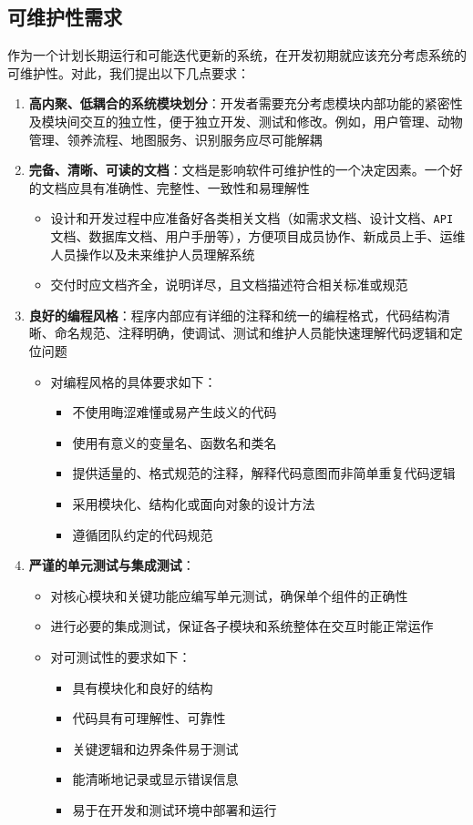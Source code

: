 \documentclass[12pt,a4paper,UTF8]{article}
\begin{document}
\subsection{可维护性需求}
作为一个计划长期运行和可能迭代更新的系统，在开发初期就应该充分考虑系统的可维护性。对此，我们提出以下几点要求：
\begin{enumerate}
    \item \textbf{高内聚、低耦合的系统模块划分}：开发者需要充分考虑模块内部功能的紧密性及模块间交互的独立性，便于独立开发、测试和修改。例如，用户管理、动物管理、领养流程、地图服务、识别服务应尽可能解耦
    \item \textbf{完备、清晰、可读的文档}：文档是影响软件可维护性的一个决定因素。一个好的文档应具有准确性、完整性、一致性和易理解性
    \begin{itemize}
        \item 设计和开发过程中应准备好各类相关文档（如需求文档、设计文档、\verb|API| 文档、数据库文档、用户手册等），方便项目成员协作、新成员上手、运维人员操作以及未来维护人员理解系统
        \item 交付时应文档齐全，说明详尽，且文档描述符合相关标准或规范
    \end{itemize}
    \item \textbf{良好的编程风格}：程序内部应有详细的注释和统一的编程格式，代码结构清晰、命名规范、注释明确，使调试、测试和维护人员能快速理解代码逻辑和定位问题
    \begin{itemize}
        \item 对编程风格的具体要求如下：
        \begin{itemize}
            \item 不使用晦涩难懂或易产生歧义的代码
            \item 使用有意义的变量名、函数名和类名
            \item 提供适量的、格式规范的注释，解释代码意图而非简单重复代码逻辑
            \item 采用模块化、结构化或面向对象的设计方法
            \item 遵循团队约定的代码规范
        \end{itemize}
    \end{itemize}
    \item \textbf{严谨的单元测试与集成测试}：
    \begin{itemize}
        \item 对核心模块和关键功能应编写单元测试，确保单个组件的正确性
        \item 进行必要的集成测试，保证各子模块和系统整体在交互时能正常运作
        \item 对可测试性的要求如下：
        \begin{itemize}
            \item 具有模块化和良好的结构
            \item 代码具有可理解性、可靠性
            \item 关键逻辑和边界条件易于测试
            \item 能清晰地记录或显示错误信息
            \item 易于在开发和测试环境中部署和运行
        \end{itemize}
    \end{itemize}
\end{enumerate}
\end{document}

